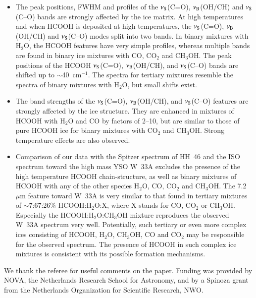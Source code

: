 \documentclass{aa}
\begin{document}
\begin{itemize}

\item The peak positions, FWHM and profiles of the $\nu_{\rm S}$(C=O),
$\nu_{\rm B}$(OH/CH) and $\nu_{\rm S}$(C--O) bands are strongly
affected by the ice matrix. At high temperatures and when HCOOH is
deposited at high temperatures, the $\nu_{\rm S}$(C=O), $\nu_{\rm
B}$(OH/CH) and $\nu_{\rm S}$(C--O) modes split into two bands. In
binary mixtures with H$_2$O, the HCOOH features have very simple
profiles, whereas multiple bands are found in binary ice mixtures with
CO, CO$_2$ and CH$_3$OH. The peak positions of the HCOOH $\nu_{\rm
S}$(C=O), $\nu_{\rm B}$(OH/CH), and $\nu_{\rm S}$(C--O) bands are
shifted up to $\sim$40~cm$^{-1}$. The spectra for tertiary mixtures
resemble the spectra of binary mixtures with H$_2$O, but small shifts
exist.

\item The band strengths of the $\nu_{\rm S}$(C=O), $\nu_{\rm
B}$(OH/CH), and $\nu_{\rm S}$(C--O) features are strongly affected by
the ice structure. They are enhanced in mixtures of HCOOH with H$_2$O
and CO by factors of 2--10, but are similar to those of pure HCOOH ice
for binary mixtures with CO$_2$ and CH$_3$OH. Strong temperature
effects are also observed.

\item Comparison of our data with the Spitzer spectrum of HH~46 and
the ISO spectrum toward the high mass YSO W~33A excludes the presence
of the high temperature HCOOH chain-structure, as well as binary
mixtures of HCOOH with any of the other species H$_2$O, CO, CO$_2$ and
CH$_3$OH. The 7.2~$\mu$m feature toward W~33A is very similar to that
found in tertiary mixtures of $\sim$7:67:26\% HCOOH:H$_2$O:X, where X
stands for CO, CO$_2$ or CH$_3$OH. Especially the
HCOOH:H$_2$O:CH$_3$OH mixture reproduces the observed W~33A spectrum
very well. Potentially, such tertiary or even more complex ices
consisting of HCOOH, H$_2$O, CH$_3$OH, CO and CO$_2$ may be
responsible for the observed spectrum. The presence of HCOOH in such
complex ice mixtures is consistent with its possible formation
mechanisms.

\end{itemize}

\begin{acknowledgements}
  We thank the referee for useful comments on the paper. Funding was
  provided by NOVA, the Netherlands Research School for Astronomy, and
  by a Spinoza grant from the Netherlands Organization for Scientific
  Research, NWO.
\end{acknowledgements}
\end{document}
